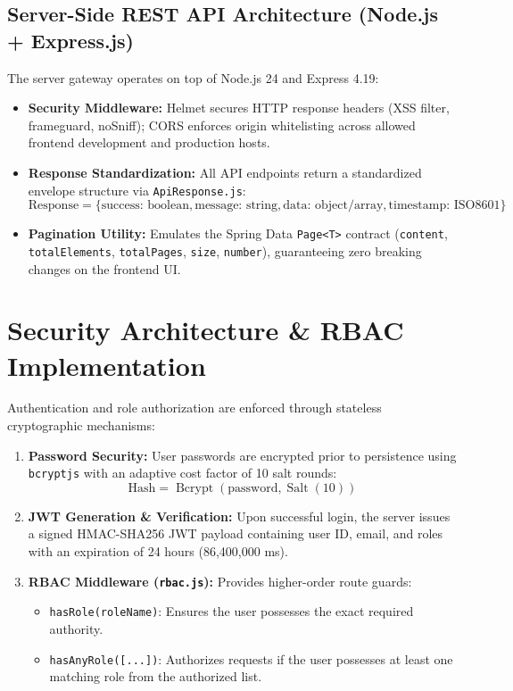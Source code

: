 \subsection{Server-Side REST API Architecture (Node.js + Express.js)}
The server gateway operates on top of Node.js 24 and Express 4.19:
\begin{itemize}
    \item \textbf{Security Middleware:} Helmet secures HTTP response headers (XSS filter, frameguard, noSniff); CORS enforces origin whitelisting across allowed frontend development and production hosts.
    \item \textbf{Response Standardization:} All API endpoints return a standardized envelope structure via \texttt{ApiResponse.js}:
    \begin{equation}
    \text{Response} = \{ \text{success: boolean}, \text{message: string}, \text{data: object/array}, \text{timestamp: ISO8601} \}
    \end{equation}
    \item \textbf{Pagination Utility:} Emulates the Spring Data \texttt{Page<T>} contract (\texttt{content}, \texttt{totalElements}, \texttt{totalPages}, \texttt{size}, \texttt{number}), guaranteeing zero breaking changes on the frontend UI.
\end{itemize}

\section{Security Architecture \& RBAC Implementation}
Authentication and role authorization are enforced through stateless cryptographic mechanisms:
\begin{enumerate}
    \item \textbf{Password Security:} User passwords are encrypted prior to persistence using \texttt{bcryptjs} with an adaptive cost factor of 10 salt rounds:
    \begin{equation}
    \text{Hash} = \operatorname{Bcrypt}(\text{password}, \operatorname{Salt}(10))
    \end{equation}
    \item \textbf{JWT Generation \& Verification:} Upon successful login, the server issues a signed HMAC-SHA256 JWT payload containing user ID, email, and roles with an expiration of 24 hours (86,400,000 ms).
    \item \textbf{RBAC Middleware (\texttt{rbac.js}):} Provides higher-order route guards:
    \begin{itemize}
        \item \texttt{hasRole(roleName)}: Ensures the user possesses the exact required authority.
        \item \texttt{hasAnyRole([...])}: Authorizes requests if the user possesses at least one matching role from the authorized list.
    \end{itemize}
\end{enumerate}

